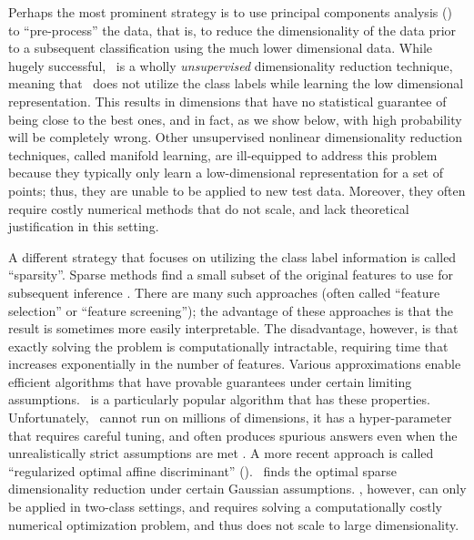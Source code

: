 \documentclass[10pt]{article}
\begin{document}
Perhaps the most prominent strategy is to use principal components analysis (\Pca) \cite{PCA} to ``pre-process'' the data, that is, to reduce the dimensionality of the data prior to a subsequent classification using the much lower dimensional data.  While hugely successful, \Pca~is a wholly \emph{unsupervised} dimensionality reduction technique, meaning that \Pca~does not utilize the class labels while learning the low dimensional representation.  This results in dimensions that have no statistical guarantee of being close to the best ones, and in fact, as we show below, with high probability will be completely wrong.  Other unsupervised nonlinear dimensionality reduction techniques,  called manifold learning, are ill-equipped to address this problem because they typically only learn a low-dimensional representation for a set of points; thus, they are unable to be applied to  new test data.   Moreover, they often require costly numerical methods that do not scale, and lack theoretical justification in this setting. 





A different strategy that focuses on utilizing the class label information is called  ``sparsity''. Sparse methods  find a small subset of the original features to use for subsequent inference \cite{sparsity}. There are many such approaches (often called ``feature selection'' or ``feature screening''); the advantage of these approaches is that the result is sometimes more easily interpretable.  The disadvantage, however, is that exactly solving the problem is computationally intractable, requiring time that increases exponentially in the number of features.  Various approximations enable efficient algorithms that have provable guarantees under certain limiting assumptions.  \Lasso~is a particularly popular algorithm that has these properties. Unfortunately, \Lasso~cannot run on millions of dimensions,  it has a hyper-parameter that requires careful tuning, and  often produces spurious answers even when the unrealistically strict assumptions are met \cite{lasso-fail}.
A more recent approach is called ``regularized optimal affine discriminant'' (\Road). \Road~finds the optimal sparse dimensionality reduction under certain Gaussian assumptions.  \Road, however, can only be applied in two-class settings, and requires solving a computationally costly numerical optimization problem, and thus does not scale to large dimensionality.
\end{document}
